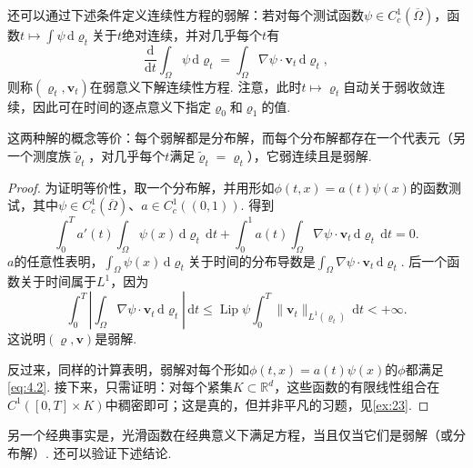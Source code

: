 还可以通过下述条件定义连续性方程的弱解：若对每个测试函数$\psi\in C_c^1(\overline\Omega)$，函数$t\mapsto\int\psi\,\mathrm d\varrho_t$关于$t$绝对连续，并对几乎每个$t$有
\[
 \frac{\mathrm d}{\mathrm dt}\int_\Omega\psi\,\mathrm d\varrho_t
 =\int_\Omega\nabla\psi\cdot\mathbf v_t\,\mathrm d\varrho_t,
\]
则称$(\varrho_t,\mathbf v_t)$在弱意义下解连续性方程. 注意，此时$t\mapsto\varrho_t$自动关于弱收敛连续，因此可在时间的逐点意义下指定$\varrho_0$和$\varrho_1$的值.

\begin{proposition}\label{obj:4.2}
这两种解的概念等价：每个弱解都是分布解，而每个分布解都存在一个代表元（另一个测度族$\widetilde\varrho_t$，对几乎每个$t$满足$\widetilde\varrho_t=\varrho_t$），它弱连续且是弱解.
\end{proposition}
\begin{proof}
为证明等价性，取一个分布解，并用形如$\phi(t,x)=a(t)\psi(x)$的函数测试，其中$\psi\in C_c^1(\overline\Omega)$、$a\in C_c^1((0,1))$. 得到
\[
 \int_0^T a'(t)\int_\Omega\psi(x)\,\mathrm d\varrho_t\,\mathrm dt
 +\int_0^1a(t)\int_\Omega\nabla\psi\cdot\mathbf v_t\,\mathrm d\varrho_t\,\mathrm dt=0.
\]
$a$的任意性表明，$\int_\Omega\psi(x)\,\mathrm d\varrho_t$关于时间的分布导数是$\int_\Omega\nabla\psi\cdot\mathbf v_t\,\mathrm d\varrho_t$. 后一个函数关于时间属于$L^1$，因为
\[
 \int_0^T\left|\int_\Omega\nabla\psi\cdot\mathbf v_t\,\mathrm d\varrho_t\right|\,\mathrm dt
 \leq\operatorname{Lip}\psi\int_0^T\|\mathbf v_t\|_{L^1(\varrho_t)}\,\mathrm dt<+\infty.
\]
这说明$(\varrho,\mathbf v)$是弱解.

反过来，同样的计算表明，弱解对每个形如$\phi(t,x)=a(t)\psi(x)$的$\phi$都满足\eqref{eq:4.2}. 接下来，只需证明：对每个紧集$K\subset\mathbb R^d$，这些函数的有限线性组合在$C^1([0,T]\times K)$中稠密即可；这是真的，但并非平凡的习题，见\autoref{ex:23}.
\end{proof}

另一个经典事实是，光滑函数在经典意义下满足方程，当且仅当它们是弱解（或分布解）. 还可以验证下述结论.

